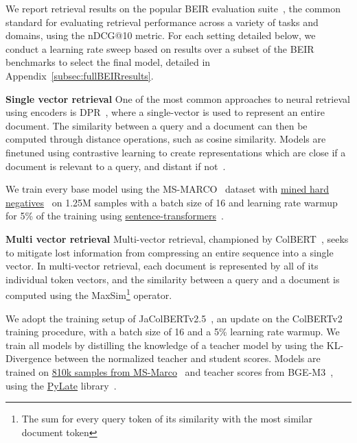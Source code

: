 \documentclass[11pt]{article}
\begin{document}
We report retrieval results on the popular BEIR evaluation suite~\cite{BEIR}, the common standard for evaluating retrieval performance across a variety of tasks and domains, using the nDCG@10 metric. For each setting detailed below, we conduct a learning rate sweep based on results over a subset of the BEIR benchmarks to select the final model, detailed in Appendix~\ref{subsec:fullBEIRresults}.


\textbf{Single vector retrieval}
One of the most common approaches to neural retrieval using encoders is DPR~\cite{DBLP:conf/emnlp/KarpukhinOMLWEC20}, where a single-vector is used to represent an entire document. The similarity between a query and a document can then be computed through distance operations, such as cosine similarity. Models are finetuned using contrastive learning to create representations which are close if a document is relevant to a query, and distant if not~\cite{DBLP:journals/corr/abs-1807-03748}. 

We train every base model using the MS-MARCO~\cite{msmarco} dataset with \href{https://huggingface.co/datasets/sentence-transformers/msmarco-co-condenser-margin-mse-sym-mnrl-mean-v1}{mined hard negatives}~\cite{hardnegs} on 1.25M samples with a batch size of 16 and learning rate warmup for 5\% of the training using \href{https://sbert.net/}{sentence-transformers}~\cite{reimers-2019-sentence-bert}.

\textbf{Multi vector retrieval}
\label{subsubsection:colbert}
Multi-vector retrieval, championed by ColBERT~\cite{DBLP:conf/sigir/KhattabZ20}, seeks to mitigate lost information from compressing an entire sequence into a single vector. In multi-vector retrieval, each document is represented by all of its individual token vectors, and the similarity between a query and a document is computed using the MaxSim\footnote{The sum for every query token of its similarity with the most similar document token} operator.

We adopt the training setup of JaColBERTv2.5~\cite{jacolbertv25}, an update on the ColBERTv2~\cite{DBLP:conf/naacl/SanthanamKSPZ22} training procedure, with a batch size of 16 and a 5\% learning rate warmup. We train all models by distilling the knowledge of a teacher model by using the KL-Divergence between the normalized teacher and student scores. Models are trained on \href{https://huggingface.co/datasets/lightonai/ms-marco-en-bge}{810k samples from MS-Marco}~\cite{msmarco} and teacher scores from BGE-M3~\cite{DBLP:conf/acl/ChenXZLLL24}, using the \href{https://github.com/lightonai/pylate}{PyLate} library~\cite{PyLate}.
\end{document}
